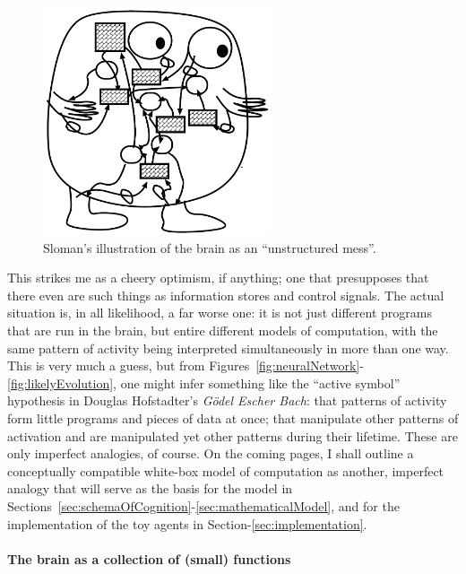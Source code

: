 \begin{figure}
	\centering
	\includegraphics[width=0.6\textwidth]{Figs/slomanBrain.png}
	\caption{Sloman's illustration of the brain as an ``unstructured mess''.}
	\label{fig:slomanBrain}
\end{figure}

This strikes me as a cheery optimism, if anything; one that presupposes that there even are such things as information stores and control signals. The actual situation is, in all likelihood, a far worse one: it is not just different programs that are run in the brain, but entire different models of computation, with the same pattern of activity being interpreted simultaneously in more than one way. This is very much a guess, but from Figures~\ref{fig:neuralNetwork}-\ref{fig:likelyEvolution}, one might infer something like the ``active symbol'' hypothesis in Douglas Hofstadter's {\em G\"{o}del Escher Bach}: that patterns of activity form little programs and pieces of data at once; that manipulate other patterns of activation and are manipulated yet other patterns during their lifetime. These are only imperfect analogies, of course. On the coming pages, I shall outline a conceptually compatible white-box model of computation as another, imperfect analogy that will serve as the basis for the model in Sections~\ref{sec:schemaOfCognition}-\ref{sec:mathematicalModel}, and for the implementation of the toy agents in Section-\ref{sec:implementation}.

\paragraph{The brain as a collection of (small) functions}

